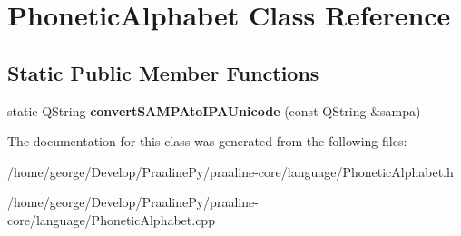 \hypertarget{class_phonetic_alphabet}{}\section{Phonetic\+Alphabet Class Reference}
\label{class_phonetic_alphabet}
\subsection*{Static Public Member Functions}
\begin{DoxyCompactItemize}
\item 
\mbox{\label{class_phonetic_alphabet_afed87c6b4b212071b6a15a98637e70eb}} 
static Q\+String {\bfseries convert\+S\+A\+M\+P\+Ato\+I\+P\+A\+Unicode} (const Q\+String \&sampa)
\end{DoxyCompactItemize}


The documentation for this class was generated from the following files\+:\begin{DoxyCompactItemize}
\item 
/home/george/\+Develop/\+Praaline\+Py/praaline-\/core/language/Phonetic\+Alphabet.\+h\item 
/home/george/\+Develop/\+Praaline\+Py/praaline-\/core/language/Phonetic\+Alphabet.\+cpp\end{DoxyCompactItemize}
